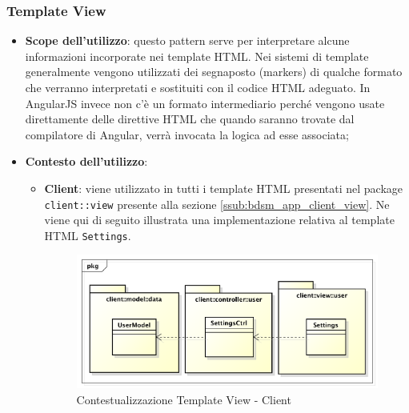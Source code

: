 	\subsubsection{Template View} %
	\label{ssub:template_view}
		\begin{itemize}
			\item \textbf{Scope dell'utilizzo}: questo pattern serve per interpretare alcune informazioni incorporate nei template HTML. Nei sistemi di template generalmente vengono utilizzati dei segnaposto (markers) di qualche formato che verranno interpretati e sostituiti con il codice HTML adeguato. In AngularJS invece non c'è un formato intermediario perché vengono usate direttamente delle direttive HTML che quando saranno trovate dal compilatore di Angular, verrà invocata la logica ad esse associata;
			\item \textbf{Contesto dell'utilizzo}:
				\begin{itemize}
					\item \textbf{Client}: viene utilizzato in tutti i template HTML presentati nel package \texttt{client::view} presente alla sezione \ref{ssub:bdsm_app_client_view}. \newline
					Ne viene qui di seguito illustrata una implementazione relativa al template HTML \texttt{Settings}. \newline
					\begin{figure}[!htbp]
						\centering
						\centerline{\includegraphics[scale=0.50]{./images/design_pattern_client/client_template_view.pdf}}
						\caption{Contestualizzazione Template View - Client}
					\end{figure}
				\end{itemize}
		\end{itemize}


